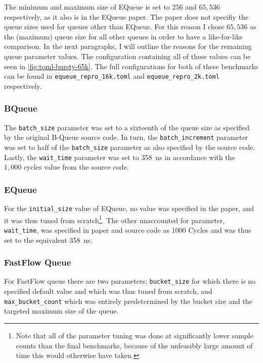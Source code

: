 The minimum and maximum size of EQueue is set to $256$ and $65,536$ respectively, as it also is in the EQueue paper.
The paper does not specifiy the queue sizes used for queues other than EQueue.
For this reason I chose $65,536$ as the (maximum) queue size for all other queues in order to have a
like-for-like comparison.
In the next paragraphs, I will outline the reasons for the remaining queue parameter values.
The configuration containing all of these values can be seen in \autoref{fig:toml-bursty-65k}.
The full configurations for both of these benchmarks can be found in \texttt{equeue\_repro\_16k.toml} and
\texttt{equeue\_repro\_2k.toml} respectively.



\subsubsection*{BQueue}
The \texttt{batch\_size} parameter was set to a sixteenth of the queue size as specified by the original
B-Queue source code.
In turn, the \texttt{batch\_increment} parameter was set to half of the \texttt{batch\_size} parameter as
also specified by the source code.
Lastly, the \texttt{wait\_time} parameter was set to \SI{358}{\nano\second} in accordance with the
$1,000\text{ cycles}$ value from the source code.

\subsubsection*{EQueue}
For the \texttt{initial\_size} value of EQueue, no value was specified in the paper, and it was thus tuned
from scratch\footnote{Note that all of the parameter tuning was done at significantly lower sample counts
than the final benchmarks, because of the unfeasibly large amount of time this would otherwise have taken.}.
The other unaccounted for parameter, \texttt{wait\_time}, was specified in paper and source code as 1000
Cycles and was thus set to the equivalent \SI{358}{\nano\second}.

\subsubsection*{FastFlow Queue}
For FastFlow queue there are two parameters; \texttt{bucket\_size} for which there is no specified default
value and which was thus tuned from scratch, and \texttt{max\_bucket\_count} which was entirely predetermined by
the bucket size and the targeted maximum size of the queue.

